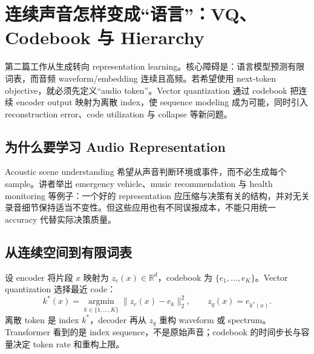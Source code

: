 \section{连续声音怎样变成“语言”：VQ、Codebook 与 Hierarchy}

第二篇工作从生成转向 representation learning。核心障碍是：语言模型预测有限词表，而音频 waveform/embedding 连续且高频。若希望使用 next-token objective，就必须先定义“audio token”。Vector quantization 通过 codebook 把连续 encoder output 映射为离散 index，使 sequence modeling 成为可能，同时引入 reconstruction error、code utilization 与 collapse 等新问题。


\subsection{为什么要学习 Audio Representation}

Acoustic scene understanding 希望从声音判断环境或事件，而不必生成每个 sample。讲者举出 emergency vehicle、music recommendation 与 health monitoring 等例子：一个好的 representation 应压缩与决策有关的结构，并对无关录音细节保持适当不变性。但这些应用也有不同误报成本，不能只用统一 accuracy 代替实际决策质量。



\subsection{从连续空间到有限词表}

设 encoder 将片段 $x$ 映射为 $z_e(x)\in\mathbb{R}^d$，codebook 为 $\{e_1,\ldots,e_K\}$。Vector quantization 选择最近 code：
\[
k^*(x)=\operatorname*{argmin}_{k\in\{1,\ldots,K\}}
\|z_e(x)-e_k\|_2^2,
\qquad z_q(x)=e_{k^*(x)}.
\]
离散 token 是 index $k^*$，decoder 再从 $z_q$ 重构 waveform 或 spectrum。Transformer 看到的是 index sequence，不是原始声音；codebook 的时间步长与容量决定 token rate 和重构上限。

